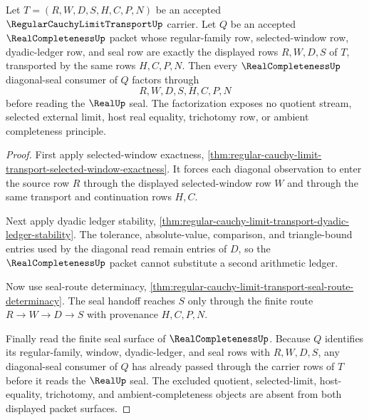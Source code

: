 \begin{theorem}
\label{thm:regular-cauchy-limit-transport-real-completeness-consumer-factorization}
Let $T=(R,W,D,S,H,C,P,N)$ be an accepted $\RegularCauchyLimitTransportUp$ carrier. Let $Q$ be an accepted $\RealCompletenessUp$ packet whose regular-family row, selected-window row, dyadic-ledger row, and seal row are exactly the displayed rows $R,W,D,S$ of $T$, transported by the same rows $H,C,P,N$. Then every $\RealCompletenessUp$ diagonal-seal consumer of $Q$ factors through
$$
R,W,D,S,H,C,P,N
$$
before reading the $\RealUp$ seal. The factorization exposes no quotient stream, selected external limit, host real equality, trichotomy row, or ambient completeness principle.
\end{theorem}
\begin{proof}
First apply selected-window exactness, \autoref{thm:regular-cauchy-limit-transport-selected-window-exactness}. It forces each diagonal observation to enter the source row $R$ through the displayed selected-window row $W$ and through the same transport and continuation rows $H,C$.

Next apply dyadic ledger stability, \autoref{thm:regular-cauchy-limit-transport-dyadic-ledger-stability}. The tolerance, absolute-value, comparison, and triangle-bound entries used by the diagonal read remain entries of $D$, so the $\RealCompletenessUp$ packet cannot substitute a second arithmetic ledger.

Now use seal-route determinacy, \autoref{thm:regular-cauchy-limit-transport-seal-route-determinacy}. The seal handoff reaches $S$ only through the finite route $R \to W \to D \to S$ with provenance $H,C,P,N$.

Finally read the finite seal surface of $\RealCompletenessUp$. Because $Q$ identifies its regular-family, window, dyadic-ledger, and seal rows with $R,W,D,S$, any diagonal-seal consumer of $Q$ has already passed through the carrier rows of $T$ before it reads the $\RealUp$ seal. The excluded quotient, selected-limit, host-equality, trichotomy, and ambient-completeness objects are absent from both displayed packet surfaces.
\end{proof}

